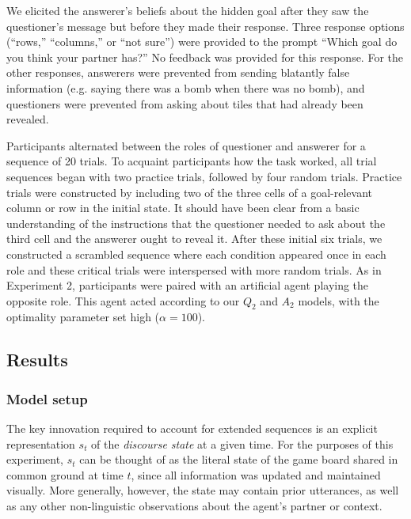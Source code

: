 \documentclass[12pt, floatsintext, jou]{apa6}
\begin{document}
We elicited the answerer's beliefs about the hidden goal after they saw the questioner's message but before they made their response.
Three response options (``rows,'' ``columns,'' or ``not sure'') were provided to the prompt ``Which goal do you think your partner has?'' 
No feedback was provided for this response.
For the other responses, answerers were prevented from sending blatantly false information (e.g. saying there was a bomb when there was no bomb), and questioners were prevented from asking about tiles that had already been revealed.

Participants alternated between the roles of questioner and answerer for a sequence of 20 trials. 
To acquaint participants how the task worked, all trial sequences began with two practice trials, followed by four random trials.
Practice trials were constructed by including two of the three cells of a goal-relevant column or row in the initial state. 
It should have been clear from a basic understanding of the instructions that the questioner needed to ask about the third cell and the answerer ought to reveal it. 
After these initial six trials, we constructed a scrambled sequence where each condition appeared once in each role and these critical trials were interspersed with more random trials.
As in Experiment 2, participants were paired with an artificial agent playing the opposite role. 
This agent acted according to our $Q_2$ and $A_2$ models, with the optimality parameter set high ($\alpha = 100$). 

\subsection{Results}

\subsubsection{Model setup}

The key innovation required to account for extended sequences is an explicit representation $s_t$ of the \emph{discourse state} at a given time. 
For the purposes of this experiment, $s_t$ can be thought of as the literal state of the game board shared in common ground at time $t$, since all information was updated and maintained visually.
More generally, however, the state may contain prior utterances, as well as any other non-linguistic observations about the agent's partner or context.
\end{document}
